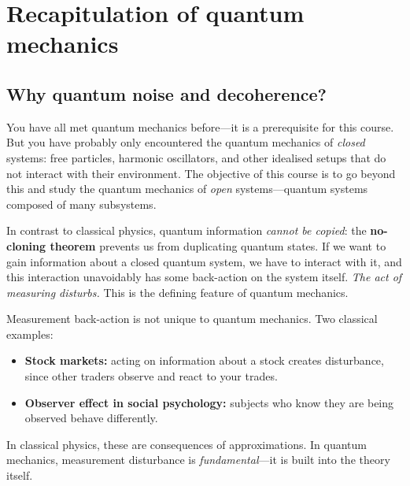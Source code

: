 
\section{Recapitulation of quantum mechanics}\label{sec:recap-qm}

\subsection{Why quantum noise and decoherence?}

You have all met quantum mechanics before---it is a prerequisite for
this course.  But you have probably only encountered the quantum
mechanics of \emph{closed} systems: free particles, harmonic
oscillators, and other idealised setups that do not interact with
their environment.  The objective of this course is to go beyond this
and study the quantum mechanics of \emph{open} systems---quantum
systems composed of many subsystems.

In contrast to classical physics, quantum information \emph{cannot be
copied}: the \textbf{no-cloning theorem} prevents us from duplicating
quantum states.  If we want to gain information about a closed
quantum system, we have to interact with it, and this interaction
unavoidably has some back-action on the system itself.  \emph{The act
of measuring disturbs.}  This is the defining feature of quantum
mechanics.

\begin{intuition}
  Measurement back-action is not unique to quantum mechanics.  Two
  classical examples:
  \begin{itemize}
    \item \textbf{Stock markets:} acting on information about a stock
      creates disturbance, since other traders observe and react to your
      trades.
    \item \textbf{Observer effect in social psychology:} subjects who
      know they are being observed behave differently.
  \end{itemize}
  In classical physics, these are consequences of approximations.  In
  quantum mechanics, measurement disturbance is \emph{fundamental}---it
  is built into the theory itself.
\end{intuition}

